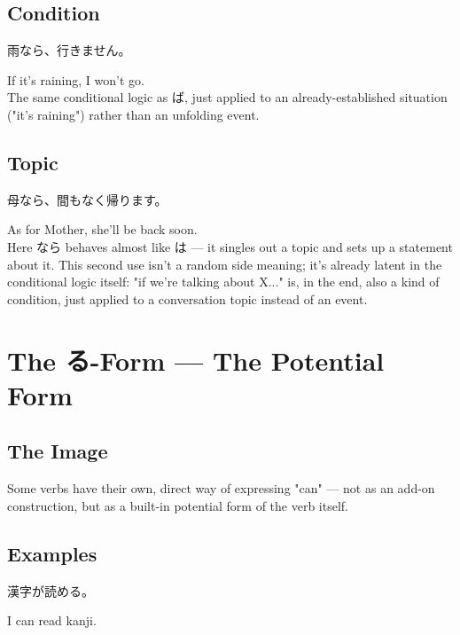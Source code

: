 \documentclass[12pt]{book}
\begin{document}
\section*{Condition}

\par\quad 雨なら、行きません。\\
\par\quad If it's raining, I won't go.\\

The same conditional logic as ば, just applied to an already-established situation ("it's raining") rather than an unfolding event.

\section*{Topic}

\par\quad 母なら、間もなく帰ります。\\
\par\quad As for Mother, she'll be back soon.\\

Here なら behaves almost like は — it singles out a topic and sets up a statement about it. This second use isn't a random side meaning; it's already latent in the conditional logic itself: "if we're talking about X..." is, in the end, also a kind of condition, just applied to a conversation topic instead of an event.


\chapter{The る-Form — The Potential Form}

\section*{The Image}

Some verbs have their own, direct way of expressing "can" — not as an add-on construction, but as a built-in potential form of the verb itself.

\section*{Examples}

\par\quad 漢字が読める。\\
\par\quad I can read kanji.\\
\end{document}

